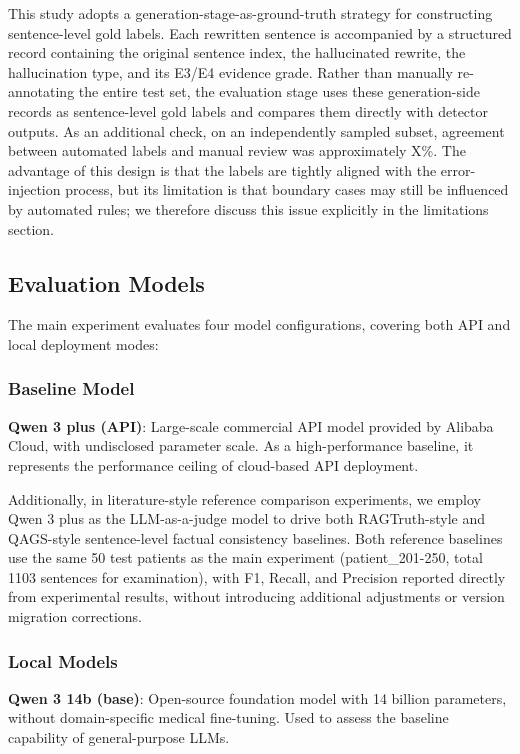 \documentclass[11pt]{article}
\begin{document}
This study adopts a generation-stage-as-ground-truth strategy for constructing sentence-level gold labels. Each rewritten sentence is accompanied by a structured record containing the original sentence index, the hallucinated rewrite, the hallucination type, and its E3/E4 evidence grade. Rather than manually re-annotating the entire test set, the evaluation stage uses these generation-side records as sentence-level gold labels and compares them directly with detector outputs. As an additional check, on an independently sampled subset, agreement between automated labels and manual review was approximately X\%. The advantage of this design is that the labels are tightly aligned with the error-injection process, but its limitation is that boundary cases may still be influenced by automated rules; we therefore discuss this issue explicitly in the limitations section.

\subsection{Evaluation Models}

The main experiment evaluates four model configurations, covering both API and local deployment modes:

\subsubsection{Baseline Model}

\textbf{Qwen 3 plus (API)}: Large-scale commercial API model provided by Alibaba Cloud, with undisclosed parameter scale. As a high-performance baseline, it represents the performance ceiling of cloud-based API deployment.

Additionally, in literature-style reference comparison experiments, we employ Qwen 3 plus as the LLM-as-a-judge model to drive both RAGTruth-style and QAGS-style sentence-level factual consistency baselines. Both reference baselines use the same 50 test patients as the main experiment (patient\_201-250, total 1103 sentences for examination), with F1, Recall, and Precision reported directly from experimental results, without introducing additional adjustments or version migration corrections.

\subsubsection{Local Models}

\textbf{Qwen 3 14b (base)}: Open-source foundation model with 14 billion parameters, without domain-specific medical fine-tuning. Used to assess the baseline capability of general-purpose LLMs.
\end{document}
